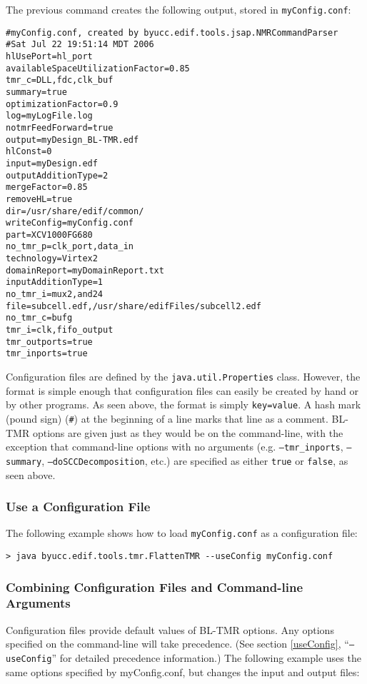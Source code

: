 \documentclass[english]{article}
\begin{document}
The previous command creates the following output, stored in 
\texttt{myConfig.conf}:

\begin{verbatim}
#myConfig.conf, created by byucc.edif.tools.jsap.NMRCommandParser
#Sat Jul 22 19:51:14 MDT 2006
hlUsePort=hl_port
availableSpaceUtilizationFactor=0.85
tmr_c=DLL,fdc,clk_buf
summary=true
optimizationFactor=0.9
log=myLogFile.log
notmrFeedForward=true
output=myDesign_BL-TMR.edf
hlConst=0
input=myDesign.edf
outputAdditionType=2
mergeFactor=0.85
removeHL=true
dir=/usr/share/edif/common/
writeConfig=myConfig.conf
part=XCV1000FG680
no_tmr_p=clk_port,data_in
technology=Virtex2
domainReport=myDomainReport.txt
inputAdditionType=1
no_tmr_i=mux2,and24
file=subcell.edf,/usr/share/edifFiles/subcell2.edf
no_tmr_c=bufg
tmr_i=clk,fifo_output
tmr_outports=true
tmr_inports=true
\end{verbatim}

Configuration files are defined by the \texttt{java.util.Properties} class. 
However, the format is simple enough that configuration files can easily be 
created by hand or by other programs. As seen above, the format is simply 
\texttt{key=value}. A hash mark (pound sign) (\texttt{\#}) at the beginning of 
a line marks that line as a comment. BL-TMR options are given just as they would 
be on the command-line, with the exception that command-line options with no 
arguments (e.g. \texttt{--tmr\_inports}, \texttt{--summary}, 
\texttt{--doSCCDecomposition}, etc.) are specified as either \texttt{true} or 
\texttt{false}, as seen above.

\subsubsection{Use a Configuration File}

The following example shows how to load \texttt{myConfig.conf} as a configuration
file:

\begin{verbatim}
> java byucc.edif.tools.tmr.FlattenTMR --useConfig myConfig.conf
\end{verbatim}

\subsubsection{Combining Configuration Files and Command-line Arguments}
Configuration files provide default values of BL-TMR options. Any options 
specified on the command-line will take precedence. (See section 
\ref{useConfig}, ``\texttt{--useConfig}'' for detailed precedence information.)
The following example uses the same options specified by myConfig.conf, but
changes the input and output files:
\end{document}
